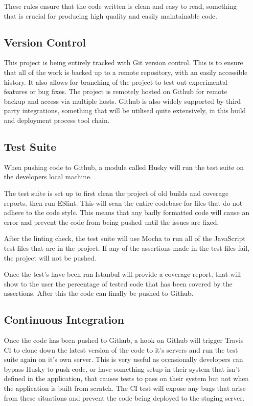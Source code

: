   These rules ensure that the code written is clean and easy to read, something that is crucial for producing high quality and easily maintainable code. 

  \subsection{Version Control}
    This project is being entirely tracked with Git version control. This is to ensure that all of the work is backed up to a remote repository, with an easily accessible history. It also allows for branching of the project to test out experimental features or bug fixes. The project is remotely hosted on Github\cite{github} for remote backup and access via multiple hosts. Github is also widely supported by third party integrations, something that will be utilised quite extensively, in this build and deployment process tool chain.


  \subsection{Test Suite}
  When pushing code to Github, a module called Husky\cite{husky} will run the test suite on the developers local machine.

    The test suite is set up to first clean the project of old builds and coverage reports, then run ESlint\cite{eslint}. This will scan the entire codebase for files that do not adhere to the code style. This means that any badly formatted code will cause an error and prevent the code from being pushed until the issues are fixed.

    After the linting check, the test suite will use Mocha\cite{mocha} to run all of the JavaScript test files that are in the project. If any of the assertions made in the test files fail, the project will not be pushed. 

    Once the test's have been ran Istanbul\cite{istanbul} will provide a coverage report, that will show to the user the percentage of tested code that has been covered by the assertions. After this the code can finally be pushed to Github. 
    
  \subsection{Continuous Integration}
    Once the code has been pushed to Github, a hook on Github will trigger Travis CI\cite{travis} to clone down the latest version of the code to it's servers and run the test suite again on it's own server. This is very useful as occasionally developers can bypass Husky to push code, or have something setup in their system that isn't defined in the application, that causes tests to pass on their system but not when the application is built from scratch. The CI test will expose any bugs that arise from these situations and prevent the code being deployed to the staging server. 


